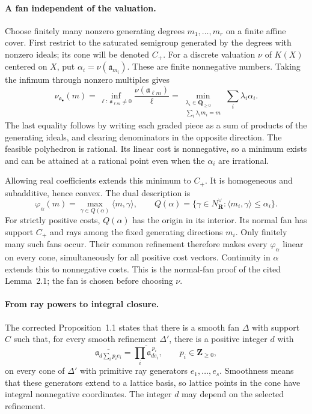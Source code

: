 \paragraph{A fan independent of the valuation.}
Choose finitely many nonzero generating degrees $m_1,\ldots,m_r$ on a
finite affine cover. First restrict to the saturated semigroup generated
by the degrees with nonzero ideals; its cone will be denoted $C_+$.
For a discrete valuation $\nu$ of $K(X)$ centered on $X$, put
$\alpha_i=\nu(\mathfrak a_{m_i})$. These are finite nonnegative numbers.
Taking the infimum through nonzero multiples gives
\[\tag{C.18b}\label{eq:appC-fan-cost}
 \nu_{\mathfrak a_\bullet}(m)
 =\inf_{\ell:\,\mathfrak a_{\ell m}\ne0}
       \frac{\nu(\mathfrak a_{\ell m})}{\ell}
 =\min_{\substack{\lambda_i\in\mathbf Q_{\geq0}\\
                         \sum_i\lambda_i m_i=m}}
                         \sum_i\lambda_i\alpha_i.
\]
The last equality follows by writing each graded piece as a sum of
products of the generating ideals, and clearing denominators in the
opposite direction. The feasible polyhedron is rational. Its linear
cost is nonnegative, so a minimum exists and can be attained at a
rational point even when the $\alpha_i$ are irrational.

Allowing real coefficients extends this minimum to $C_+$. It is
homogeneous and subadditive, hence convex. The dual description is
\[\tag{C.18c}\label{eq:appC-fan-dual}
 \varphi_\alpha(m)=\max_{\gamma\in Q(\alpha)}\langle m,\gamma\rangle,
 \qquad
 Q(\alpha)=\{\gamma\in N_{\mathbf R}^{\vee}:
                       \langle m_i,\gamma\rangle\leq\alpha_i\}.
\]
For strictly positive costs, $Q(\alpha)$ has the origin in its interior.
Its normal fan has support $C_+$ and rays among the fixed generating
directions $m_i$. Only finitely many such fans occur. Their common
refinement therefore makes every $\varphi_\alpha$ linear on every cone,
simultaneously for all positive cost vectors. Continuity in $\alpha$
extends this to nonnegative costs. This is the normal-fan proof of
the cited Lemma~2.1; the fan is chosen before choosing $\nu$.

\paragraph{From ray powers to integral closure.}
The corrected Proposition~1.1 states that there is a smooth fan $\Delta$
with support $C$ such that, for every smooth refinement $\Delta'$, there
is a positive integer $d$ with
\[\tag{C.18d}\label{eq:appC-fan-integral-closure}
 \overline{\mathfrak a_{d\sum_i p_i e_i}}
    =\overline{\prod_i\mathfrak a_{d e_i}^{\,p_i}},
 \qquad p_i\in\mathbf Z_{\geq0},
\]
on every cone of $\Delta'$ with primitive ray generators
$e_1,\ldots,e_s$. Smoothness means that these generators extend to a
lattice basis, so lattice points in the cone have integral nonnegative
coordinates. The integer $d$ may depend on the selected refinement.

